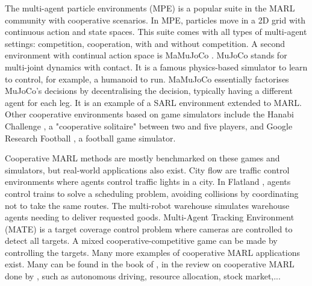 
The multi-agent particle environments (MPE) \citep{lowe2017multi} is a popular suite in the MARL community with cooperative scenarios.
In MPE, particles move in a 2D grid with continuous action and state spaces.
This suite comes with all types of multi-agent settings: competition, cooperation, with and without competition.
A second environment with continual action space is MaMuJoCo \citep{peng2021facmac}.
MuJoCo \citep{todorov2012mujoco} stands for multi-joint dynamics with contact.
It is a famous physics-based simulator to learn to control, for example, a humanoid to run.
MaMuJoCo essentially factorises MuJoCo's decisions by decentralising the decision, typically having a different agent for each leg.
It is an example of a SARL environment extended to MARL.
Other cooperative environments based on game simulators include the Hanabi Challenge \citep{Bard_2020}, a "cooperative solitaire" between two and five players, and Google Research Football \citep{kurach2020google}, a football game simulator.

Cooperative MARL methods are mostly benchmarked on these games and simulators, but real-world applications also exist.
City flow \citep{zhang2019cityflow} are traffic control environments where agents control traffic lights in a city.
In Flatland \citep{mohanty2020flatland}, agents control trains to solve a scheduling problem, avoiding collisions by coordinating not to take the same routes.
The multi-robot warehouse \citep{papoudakis2021benchmarking, christianos2020shared} simulates warehouse agents needing to deliver requested goods.
Multi-Agent Tracking Environment (MATE) \citep{NEURIPS2022_b2a1c152} is a target coverage control problem where cameras are controlled to detect all targets.
A mixed cooperative-competitive game can be made by controlling the targets.
Many more examples of cooperative MARL applications exist.
Many can be found in the book of \cite{marl-book}, in the review on cooperative MARL done by \cite{oroojlooy2022review}, such as autonomous driving, resource allocation, stock market,...


